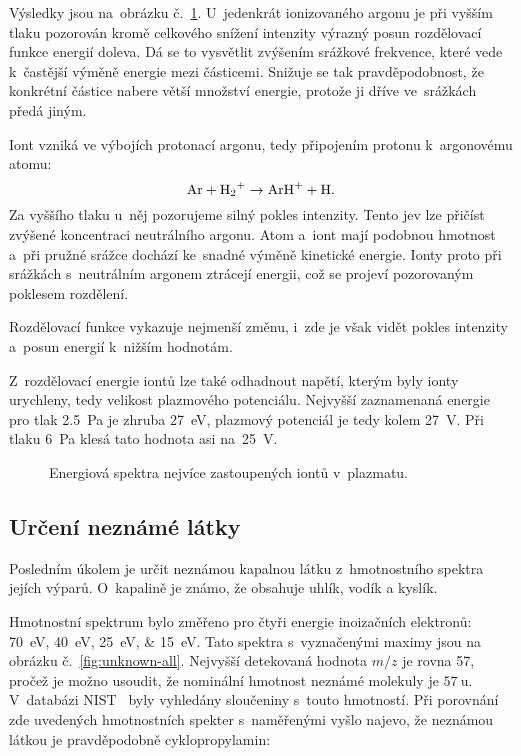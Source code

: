 \documentclass{protokol}
\newcommand\mz{m/z}
\begin{document}
Výsledky jsou na~obrázku č.~\ref{fig:energy}.
U~jedenkrát ionizovaného argonu je při vyšším tlaku pozorován kromě
celkového snížení intenzity výrazný posun rozdělovací funkce energií doleva.
Dá se to vysvětlit zvýšením srážkové frekvence, které vede k~častější
výměně energie mezi částicemi.
Snižuje se tak pravděpodobnost, že konkrétní částice nabere větší
množství energie, protože ji dříve ve~srážkách předá jiným.

Iont  vzniká ve výbojích protonací argonu, tedy připojením
protonu k~argonovému atomu:
\begin{equation}
	\label{eq:arh}
	\ce{Ar} + \ce{H2+} \rightarrow \ce{ArH+} + \ce{H}.
\end{equation}
Za vyššího tlaku u~něj pozorujeme silný pokles intenzity.
Tento jev lze přičíst zvýšené koncentraci neutrálního argonu.
Atom  a~iont  mají podobnou hmotnost a~při pružné srážce
dochází ke~snadné výměně kinetické energie.
Ionty proto při srážkách s~neutrálním argonem ztrácejí energii,
což se projeví pozorovaným poklesem rozdělení.

Rozdělovací funkce  vykazuje nejmenší změnu,
i~zde je však vidět pokles intenzity a~posun energií k~nižším hodnotám.

Z~rozdělovací energie iontů lze také odhadnout napětí, kterým byly ionty
urychleny, tedy velikost plazmového potenciálu.
Nejvyšší zaznamenaná energie pro tlak \SI{2.5}{\pascal} je zhruba
\SI{27}{\electronvolt}, plazmový potenciál je tedy kolem \SI{27}{\volt}.
Při tlaku \SI{6}{\pascal} klesá tato hodnota asi na~\SI{25}{\volt}.

\begin{figure}[htp]
	\centering
	
	
	\caption{Energiová spektra nejvíce zastoupených iontů v~plazmatu.}
	\label{fig:energy}
\end{figure}

\subsection{Určení neznámé látky}
\label{sec:unknown}
Posledním úkolem je určit neznámou kapalnou látku z~hmotnostního spektra
jejích výparů.
O~kapalině je známo, že obsahuje uhlík, vodík a kyslík.

Hmotnostní spektrum bylo změřeno pro čtyři energie inoizačních elektronů:
\SIlist[list-separator={, }]{70;40;25;15}{\electronvolt}.
Tato spektra s~vyznačenými maximy jsou na obrázku č.~\ref{fig:unknown-all}.
Nejvyšší detekovaná hodnota $\mz$ je rovna \SI{57}{\thomson},
pročež je možno usoudit, že nominální hmotnost neznámé molekuly
je $\SI{57}{\amu}$.
V~databázi NIST~\parencite{nist} byly vyhledány sloučeniny s~touto hmotností.
Při porovnání zde uvedených hmotnostních spekter s~naměřenými vyšlo najevo,
že neznámou látkou je pravděpodobně cyklopropylamin:
\begin{center}
\end{center}
\end{document}
